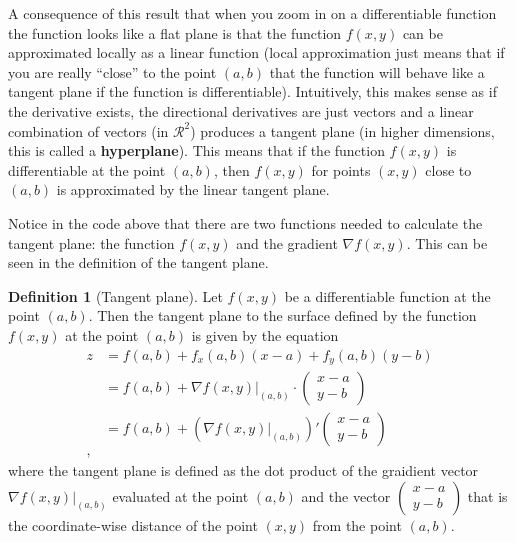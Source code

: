 \documentclass[
]{book}
\theoremstyle{definition}
\newtheorem{definition}{Definition}[chapter]
\theoremstyle{definition}
\theoremstyle{definition}
\theoremstyle{remark}
\begin{document}
A consequence of this result that when you zoom in on a differentiable function the function looks like a flat plane is that the function \(f(x, y)\) can be approximated locally as a linear function (local approximation just means that if you are really ``close'' to the point \((a, b)\) that the function will behave like a tangent plane if the function is differentiable). Intuitively, this makes sense as if the derivative exists, the directional derivatives are just vectors and a linear combination of vectors (in \(\mathcal{R}^2\)) produces a tangent plane (in higher dimensions, this is called a \textbf{hyperplane}). This means that if the function \(f(x, y)\) is differentiable at the point \((a, b)\), then \(f(x, y)\) for points \((x, y)\) close to \((a, b)\) is approximated by the linear tangent plane.

Notice in the code above that there are two functions needed to calculate the tangent plane: the function \(f(x, y)\) and the gradient \(\nabla f(x, y)\). This can be seen in the definition of the tangent plane.

\begin{definition}[Tangent plane]
\protect\hypertarget{def:unnamed-chunk-294}{}{\label{def:unnamed-chunk-294} {} }Let \(f(x, y)\) be a differentiable function at the point \((a, b)\). Then the tangent plane to the surface defined by the function \(f(x, y)\) at the point \((a, b)\) is given by the equation
\[
\begin{aligned}
z & = f(a, b) + f_x(a, b) (x - a) + f_y(a, b) (y - b) \\
& = f(a, b) + \nabla f(x, y) |_{(a, b)} \cdot \begin{pmatrix} x - a \\ y - b \end{pmatrix} \\
& = f(a, b) + (\nabla f(x, y) |_{ (a, b)})' \begin{pmatrix} x - a \\ y - b \end{pmatrix} \\,
\end{aligned}
\]
where the tangent plane is defined as the dot product of the graidient vector \(\nabla f(x, y) |_{(a, b)}\) evaluated at the point \((a, b)\) and the vector \(\begin{pmatrix} x - a \\ y - b \end{pmatrix}\) that is the coordinate-wise distance of the point \((x, y)\) from the point \((a, b)\).
\end{definition}
\end{document}
